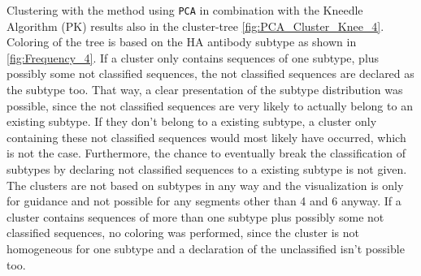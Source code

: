 Clustering with the method using \texttt{PCA} in combination with the Kneedle Algorithm (PK) results also in the cluster-tree \autoref{fig:PCA_Cluster_Knee_4}. Coloring of the tree is based on the \gls{HA} antibody subtype as shown in \autoref{fig:Frequency_4}. If a cluster only contains sequences of one subtype, plus possibly some not classified sequences, the not classified sequences are declared as the subtype too. That way, a clear presentation of the subtype distribution was possible, since the not classified sequences are very likely to actually belong to an existing subtype. If they don't belong to a existing subtype, a cluster only containing these not classified sequences would most likely have occurred, which is not the case. Furthermore, the chance to eventually break the classification of subtypes by declaring not classified sequences to a existing subtype is not given. The clusters are not based on subtypes in any way and the visualization is only for guidance and not possible for any segments other than 4 and 6 anyway. If a cluster contains sequences of more than one subtype plus possibly some not classified sequences, no coloring was performed, since the cluster is not homogeneous for one subtype and a declaration of the unclassified isn't possible too. 

\begin{table}[!hbt]
    \centering
    \caption[Anomalies in Segment 4 Cluster 29 (\texttt{PCA})]{\textbf{Anomalies in Segment 4 Cluster 29 (\texttt{PCA}).} The \glspl{MSA} mean distance of the given sequences in comparison to a sample of H9 sequences of the same cluster and a sample of unclassified sequences present in other clusters. Only the first 20 columns are presented here, the full table can be found in the \href{https://github.com/ahenoch/Masterthesis.git}{Projects GitHub Repository}.}
    \label{tab:PCA_Error_4_29}
\end{table}

